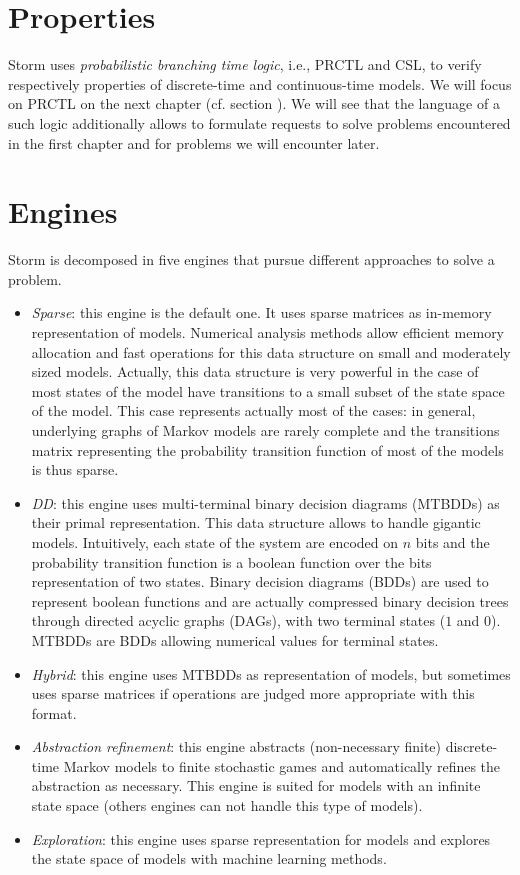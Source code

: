 \section{Properties}
Storm uses \textit{probabilistic branching time logic}, i.e., PRCTL and CSL,
to verify respectively properties of discrete-time and continuous-time models.
We will focus on PRCTL on the next chapter (cf. section ).
We will see that the language of a such logic additionally allows to formulate requests to solve problems encountered in the first chapter and for problems we will encounter later.

\section{Engines}
Storm is decomposed in five engines that pursue different approaches to solve a problem.
\begin{itemize}
  \item \textit{Sparse}: this engine is the default one. It uses sparse matrices as in-memory representation of models. Numerical analysis methods allow efficient memory allocation and fast operations for this data structure on small and moderately sized models.
  Actually, this data structure is very powerful in the case of most states of the model have transitions to a small subset of the state space of the model. This case represents actually most of the cases: in general, underlying graphs of Markov models are rarely complete and the transitions matrix representing the probability transition function of
  most of the models is thus sparse.
  \item \textit{DD}: this engine uses multi-terminal binary decision diagrams (MTBDDs) as their primal representation. This data structure allows
  to handle gigantic models. Intuitively, each state of the system are encoded on $n$ bits and the probability transition function is a boolean function
  over the bits representation of two states. Binary decision diagrams (BDDs) are
  used to represent boolean functions and are actually compressed binary decision trees through directed acyclic graphs (DAGs), with two terminal states ($1$ and $0$). MTBDDs are BDDs allowing numerical values for terminal states.
  \item \textit{Hybrid}: this engine uses MTBDDs as representation of models, but sometimes uses sparse matrices if operations are judged more appropriate with this format.
  \item \textit{Abstraction refinement}: this engine abstracts (non-necessary finite) discrete-time Markov models to finite stochastic games and automatically refines the abstraction as necessary. This engine is suited for models with an infinite state space (others engines can not handle this type of models).
  \item \textit{Exploration}: this engine uses sparse representation for models and explores the state space of models with machine learning methods.
\end{itemize}

